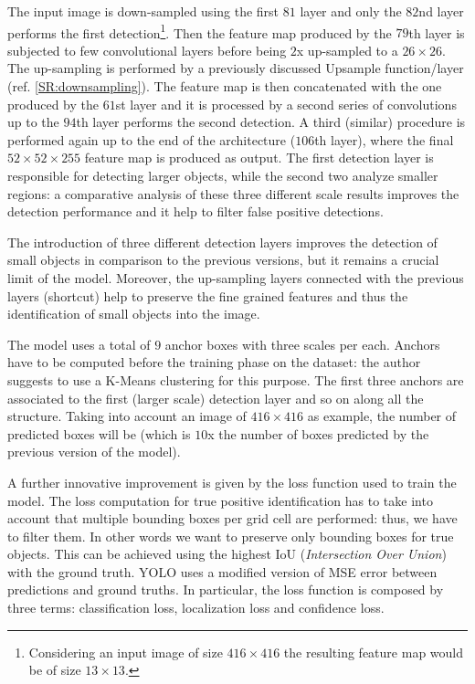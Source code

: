 \documentclass{standalone}
\begin{document}
The input image is down-sampled using the first $81$ layer and only the $82$nd layer performs the first detection\footnote{
  Considering an input image of size $416\times416$ the resulting feature map would be of size $13\times13$.
}.
Then the feature map produced by the $79$th layer is subjected to few convolutional layers before being $2$x up-sampled to a $26\times26$.
The up-sampling is performed by a previously discussed Upsample function/layer (ref. \ref{SR:downsampling}).
The feature map is then concatenated with the one produced by the $61$st layer and it is processed by a second series of convolutions up to the $94$th layer performs the second detection.
A third (similar) procedure is performed again up to the end of the architecture ($106$th layer), where the final $52\times52\times255$ feature map is produced as output.
The first detection layer is responsible for detecting larger objects, while the second two analyze smaller regions: a comparative analysis of these three different scale results improves the detection performance and it help to filter false positive detections.

The introduction of three different detection layers improves the detection of small objects in comparison to the previous versions, but it remains a crucial limit of the model.
Moreover, the up-sampling layers connected with the previous layers (shortcut) help to preserve the fine grained features and thus the identification of small objects into the image.

The model uses a total of $9$ anchor boxes with three scales per each.
Anchors have to be computed before the training phase on the dataset: the author suggests to use a K-Means clustering for this purpose.
The first three anchors are associated to the first (larger scale) detection layer and so on along all the structure.
Taking into account an image of $416\times416$ as example, the number of predicted boxes will be  (which is $10$x the number of boxes predicted by the previous version of the model).

A further innovative improvement is given by the loss function used to train the model.
The loss computation for true positive identification has to take into account that multiple bounding boxes per grid cell are performed: thus, we have to filter them.
In other words we want to preserve only bounding boxes  for true objects.
This can be achieved using the highest IoU (\emph{Intersection Over Union}) with the ground truth.
YOLO uses a modified version of MSE error between predictions and ground truths.
In particular, the loss function is composed by three terms: classification loss, localization loss and confidence loss.
\end{document}
